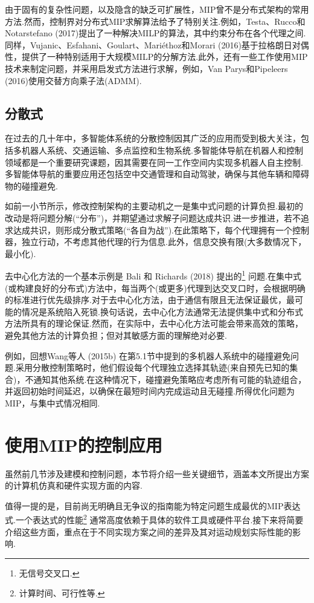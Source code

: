 \documentclass[10pt]{article}
\begin{document}
由于固有的复杂性问题，以及隐含的缺乏可扩展性，MIP曾不是分布式架构的常用方法.然而，控制界对分布式MIP求解算法给予了特别关注.例如，Testa、Rucco和Notarstefano (2017)提出了一种解决MILP的算法，其中约束分布在各个代理之间.同样，Vujanic、Esfahani、Goulart、Mariéthoz和Morari (2016)基于拉格朗日对偶性，提供了一种特别适用于大规模MILP的分解方法.此外，还有一些工作使用MIP技术来制定问题，并采用启发式方法进行求解，例如，Van Parys和Pipeleers (2016)使用交替方向乘子法(ADMM).

\subsection{分散式}

在过去的几十年中，多智能体系统的分散控制因其广泛的应用而受到极大关注，包括多机器人系统、交通运输、多点监控和生物系统.多智能体导航在机器人和控制领域都是一个重要研究课题，因其需要在同一工作空间内实现多机器人自主控制.多智能体导航的重要应用还包括空中交通管理和自动驾驶，确保与其他车辆和障碍物的碰撞避免.

如前一小节所示，修改控制架构的主要动机之一是集中式问题的计算负担.最初的改动是将问题分解(“分布”)，并期望通过求解子问题达成共识.进一步推进，若不追求达成共识，则形成分散式策略(“各自为战”).在此策略下，每个代理拥有一个控制器，独立行动，不考虑其他代理的行为信息.此外，信息交换有限(大多数情况下，最小化).

去中心化方法的一个基本示例是 Bali 和 Richards (2018) 提出的\footnote{无信号交叉口.} 问题.在集中式(或构建良好的分布式)方法中，每当两个(或更多)代理到达交叉口时，会根据明确的标准进行优先级排序.对于去中心化方法，由于通信有限且无法保证最优，最可能的情况是系统陷入死锁.换句话说，去中心化方法通常无法提供集中式和分布式方法所具有的理论保证.然而，在实际中，去中心化方法可能会带来高效的策略，避免其他方法的计算负担；但对其敏感方面的理解绝对必要.

例如，回想Wang等人 (2015b) 在第5.1节中提到的多机器人系统中的碰撞避免问题.采用分散控制策略时，他们假设每个代理独立选择其轨迹(来自预先已知的集合)，不通知其他系统.在这种情况下，碰撞避免策略应考虑所有可能的轨迹组合，并返回初始时间延迟，以确保在最短时间内完成运动且无碰撞.所得优化问题为MIP，与集中式情况相同.

\section{使用MIP的控制应用}

虽然前几节涉及建模和控制问题，本节将介绍一些关键细节，涵盖本文所提出方案的计算机仿真和硬件实现方面的内容.

值得一提的是，目前尚无明确且无争议的指南能为特定问题生成最优的MIP表达式.一个表达式的性能\footnote{计算时间、可行性等.} 通常高度依赖于具体的软件工具或硬件平台.接下来将简要介绍这些方面，重点在于不同实现方案之间的差异及其对运动规划实际性能的影响.
\end{document}
